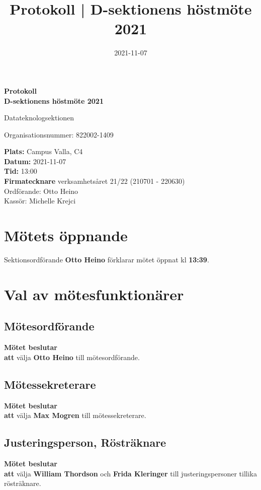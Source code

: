 \documentclass{datateknologsektionen-document}
\title{Protokoll | D-sektionens höstmöte 2021}
\date{2021-11-07}
\newcommand{\ind}{\hspace*{2em}}
\newcommand{\motetbeslutar}{\textbf{Mötet beslutar}}
\newcommand{\att}{\\\ind\textbf{att}}
\begin{document}
\hspace{0pt}
\vfill
\begin{center}
    \Huge\textbf{Protokoll \\ D-sektionens höstmöte 2021}

    \huge Datateknologsektionen

    \large
    Organisationsnummer: 822002-1409

\end{center}
\vfill
{\large
    \textbf{Plats:} Campus Valla, C4 \\
    \textbf{Datum:} 2021-11-07 \\
    \textbf{Tid:} 13:00 \\
    \textbf{Firmatecknare} verksamhetsåret 21/22 (210701 - 220630) \\
    \ind Ordförande: Otto Heino \\
    \ind Kassör: Michelle Krejci 
}
\vfill
\hspace{0pt}
\pagebreak




\tableofcontents
\pagebreak





\section{Mötets öppnande}
Sektionsordförande \textbf{Otto Heino} förklarar mötet öppnat kl \textbf{13:39}.




\section{Val av mötesfunktionärer}
\subsection{Mötesordförande}
\motetbeslutar\att{} välja \textbf{Otto Heino} till mötesordförande.

\subsection{Mötessekreterare}
\motetbeslutar\att{} välja \textbf{Max Mogren} till mötessekreterare.

\subsection{Justeringsperson, Rösträknare}
\motetbeslutar\att{} välja \textbf{William Thordson} och \textbf{Frida Kleringer} till justeringspersoner tillika rösträknare.
\end{document}
